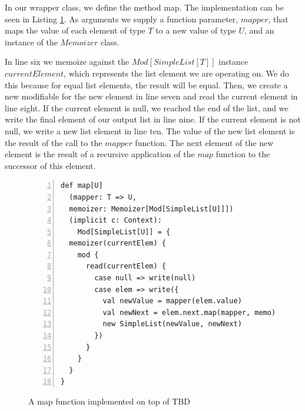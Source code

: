 In our wrapper class, we define the method map. The implementation can be seen in Listing \ref{code:map_example}. As arguments we supply a function parameter, $mapper$, that maps the value of each element of type $T$ to a new value of type $U$, and an instance of the $Memoizer$ class. 

In line six we memoize against the $Mod[SimpleList[T]]$ instance $currentElement$, which represents the list element we are operating on. We do this because for equal list elements, the result will be equal. Then, we create a new modifiable for the new element in line seven and read the current element in line eight. If the current element is null, we reached the end of the list, and we write the final element of our output list in line nine. If the current element is not null, we write a new list element in line ten. The value of the new list element is the result of the call to the $mapper$ function. The next element of the new element is the result of a recursive application of the $map$ function to the successor of this element. 

\begin{figure}
\begin{lstlisting}[frame=single,basicstyle=\ttfamily,numbers=left]
def map[U]
  (mapper: T => U, 
  memoizer: Memoizer[Mod[SimpleList[U]]])
  (implicit c: Context):
    Mod[SimpleList[U]] = {
  memoizer(currentElem) {
    mod {
      read(currentElem) {
        case null => write(null)
        case elem => write({
          val newValue = mapper(elem.value)
          val newNext = elem.next.map(mapper, memo)
          new SimpleList(newValue, newNext)
        })
      }
    }
  }
}
\end{lstlisting}
\caption{A map function implemented on top of TBD}
\label{code:map_example}
\end{figure}


